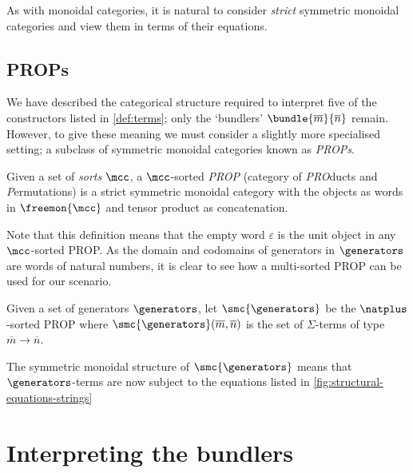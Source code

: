 As with monoidal categories, it is natural to consider \emph{strict} symmetric
monoidal categories and view them in terms of their equations.



\subsection{PROPs}

We have described the categorical structure required to interpret five of the
constructors listed in \cref{def:terms}; only the `bundlers'
\(\bundle{\overline{m}}{\overline{n}}\) remain.
However, to give these meaning we must consider a slightly more specialised
setting; a subclass of symmetric monoidal categories known as \emph{PROPs}.

\begin{definition}
    Given a set of \emph{sorts} \(\mcc\), a \(\mcc\)-sorted \emph{PROP}
    (category of \emph{PRO}ducts and \emph{P}ermutations) is a strict symmetric
    monoidal category with the objects as words in \(\freemon{\mcc}\) and tensor
    product as concatenation.
\end{definition}

Note that this definition means that the empty word \(\varepsilon\) is the unit
object in any \(\mcc\)-sorted PROP.
As the domain and codomains of generators in \(\generators\) are words of
natural numbers, it is clear to see how a multi-sorted PROP can be used for our
scenario.

\begin{definition}\label{def:freely-generated-prop}
    Given a set of generators \(\generators\), let \(\smc{\generators}\) be the
    \(\natplus\)-sorted PROP where \(
        \smc{\generators}(\overline{m}, \overline{n})
    \) is the set of \(\Sigma\)-terms of type \(\overline{m} \to \overline{n}\).
\end{definition}

The symmetric monoidal structure of \(\smc{\generators}\) means that
\(\generators\)-terms are now subject to the equations listed in
\cref{fig:structural-equations-strings}



\section{Interpreting the bundlers}

